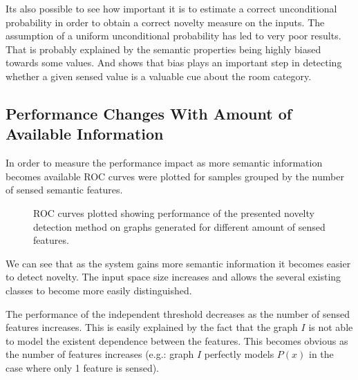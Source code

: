 Its also possible to see how important it is to estimate a correct unconditional
probability in order to obtain a correct novelty measure on the inputs.
The assumption of a uniform unconditional probability has led to very poor results.
That is probably explained by the semantic properties being highly
biased towards some values. And shows that bias plays an important step
in detecting whether a given sensed value is a valuable cue about the room category.



\subsection{Performance Changes With Amount of Available Information}
In order to measure the performance impact as more semantic information becomes
available ROC curves were plotted for samples grouped by the number of sensed
semantic features.

\begin{figure}[h]
\centering

\qquad
{}

\qquad
{}

\caption{\label{fig:synthetic-roc-breakdown}ROC curves plotted showing performance of the
         presented novelty detection method on graphs generated for different amount of
         sensed features.}
\end{figure}

We can see that as the system gains more semantic information it becomes easier
to detect novelty. The input space size increases and allows the several existing
classes to become more easily distinguished.

The performance of the independent threshold decreases as the number of sensed
features increases. This is easily explained by the fact that the graph $I$ is not
able to model the existent dependence between the features. This becomes obvious
as the number of features increases (e.g.: graph $I$ perfectly models $P(x)$ in the
case where only 1 feature is sensed).

